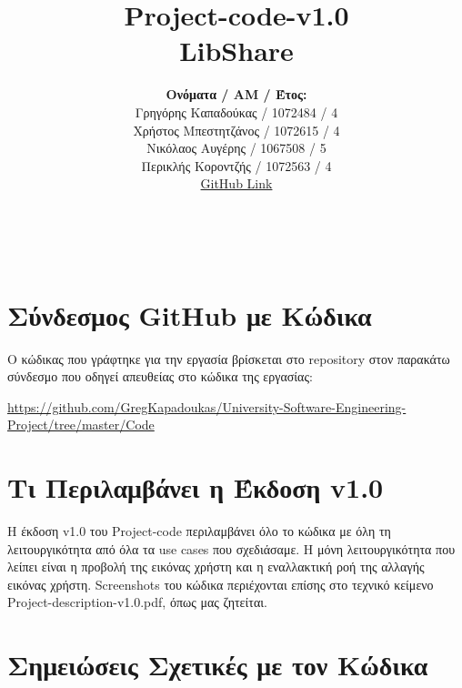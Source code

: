 \documentclass[12pt,a4paper]{article}
\title{Project-code-v1.0 \\ LibShare}
\author{\textbf{Ονόματα / ΑΜ / Έτος:} \\ Γρηγόρης Καπαδούκας / 1072484 / 4\textdegree \\ Χρήστος Μπεστητζάνος / 1072615 / 4\textdegree \\ Νικόλαος Αυγέρης / 1067508 / 5\textdegree \\ Περικλής Κοροντζής / 1072563 / 4\textdegree\\ \href{https://github.com/GregKapadoukas/University-Software-Engineering-Project}{\color{blue}GitHub Link}}
\begin{document}
\makeatletter
\begin{center}
	\LARGE{\@title} \\
	\pagebreak
    \begin{LARGE}\@author\end{LARGE}
    \pagebreak
\end{center}

\section{Σύνδεσμος GitHub με Κώδικα}
Ο κώδικας που γράφτηκε για την εργασία βρίσκεται στο repository στον παρακάτω σύνδεσμο που οδηγεί απευθείας στο κώδικα της εργασίας:

\textcolor{blue}{\href{https://github.com/GregKapadoukas/University-Software-Engineering-Project/tree/master/Code}{https://github.com/GregKapadoukas/University-Software-Engineering-\\Project/tree/master/Code}}

\section{Τι Περιλαμβάνει η Έκδοση v1.0}

Η έκδοση v1.0 του Project-code περιλαμβάνει όλο το κώδικα με όλη τη λειτουργικότητα από όλα τα use cases που σχεδιάσαμε. Η μόνη λειτουργικότητα που λείπει είναι η προβολή της εικόνας χρήστη και η εναλλακτική ροή της αλλαγής εικόνας χρήστη. Screenshots του κώδικα περιέχονται επίσης στο τεχνικό κείμενο Project-description-v1.0.pdf, όπως μας ζητείται.

\section{Σημειώσεις Σχετικές με τον Κώδικα}
\label{Notes}
\end{document}
